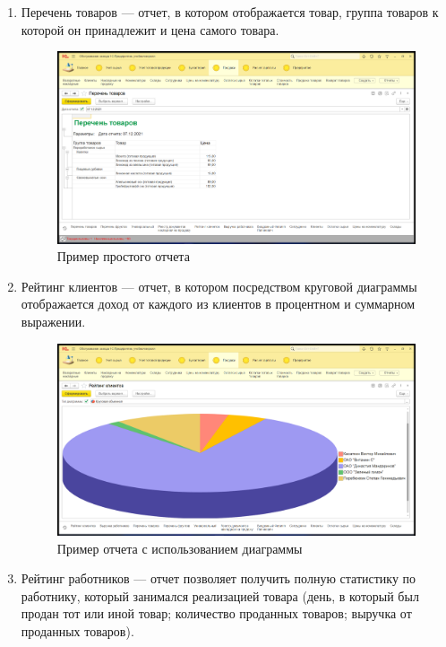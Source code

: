 \documentclass[12pt,a4paper]{article}
\begin{document}
\begin{enumerate}
    \item Перечень товаров --- отчет, в котором отображается товар, группа товаров к которой он принадлежит и цена самого товара.
    
    \begin{figure}[!ht]
        \centering
        \includegraphics[scale=0.4]{Пример простого отчета.png}
        \caption{Пример простого отчета}
        \label{fig:easy_report}
    \end{figure}
    
    \item Рейтинг клиентов --- отчет, в котором посредством круговой диаграммы отображается доход от каждого из клиентов в процентном и суммарном выражении.
    
    \begin{figure}[!ht]
        \centering
        \includegraphics[scale=0.4]{Пример отчета в виде диаграммы.png}
        \caption{Пример отчета с использованием диаграммы}
        \label{fig:diagram}
    \end{figure}
    
    \item Рейтинг работников --- отчет позволяет получить полную статистику по работнику, который занимался реализацией товара (день, в который был продан тот или иной товар; количество проданных товаров; выручка от проданных товаров).
    

\end{enumerate}
\end{document}
